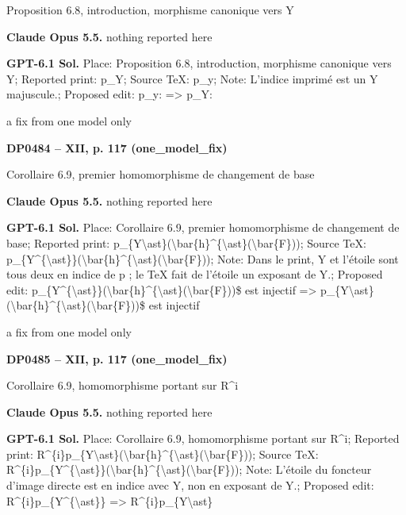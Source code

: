 Proposition 6.8, introduction, morphisme canonique vers Y\par
\textbf{Claude Opus 5.5.} nothing reported here\par
\textbf{GPT-6.1 Sol.} Place: Proposition 6.8, introduction, morphisme canonique vers Y; Reported print: p\_Y; Source TeX: p\_y; Note: L’indice imprimé est un Y majuscule.; Proposed edit: p\_y: =\allowbreak > p\_Y:\par
a fix from one model only\par
\par\noindent\hypertarget{DP0484}{}\textbf{DP0484 -- XII, p. 117 (one\_model\_fix)}\par
Corollaire 6.9, premier homomorphisme de changement de base\par
\textbf{Claude Opus 5.5.} nothing reported here\par
\textbf{GPT-6.1 Sol.} Place: Corollaire 6.9, premier homomorphisme de changement de base; Reported print: p\_\{Y\textbackslash{}ast\}(\textbackslash{}bar\{h\}\textasciicircum{}\{\textbackslash{}ast\}(\textbackslash{}bar\{F\})); Source TeX: p\_\{Y\textasciicircum{}\{\textbackslash{}ast\}\}(\textbackslash{}bar\{h\}\textasciicircum{}\{\textbackslash{}ast\}(\textbackslash{}bar\{F\})); Note: Dans le print, Y et l'étoile sont tous deux en indice de p ; le TeX fait de l'étoile un exposant de Y.; Proposed edit: p\_\{Y\textasciicircum{}\{\textbackslash{}ast\}\}(\textbackslash{}bar\{h\}\textasciicircum{}\{\textbackslash{}ast\}(\textbackslash{}bar\{F\}))\$ est injectif =\allowbreak > p\_\{Y\textbackslash{}ast\}(\textbackslash{}bar\{h\}\textasciicircum{}\{\textbackslash{}ast\}(\textbackslash{}bar\{F\}))\$ est injectif\par
a fix from one model only\par
\par\noindent\hypertarget{DP0485}{}\textbf{DP0485 -- XII, p. 117 (one\_model\_fix)}\par
Corollaire 6.9, homomorphisme portant sur R\textasciicircum{}i\par
\textbf{Claude Opus 5.5.} nothing reported here\par
\textbf{GPT-6.1 Sol.} Place: Corollaire 6.9, homomorphisme portant sur R\textasciicircum{}i; Reported print: R\textasciicircum{}\{i\}p\_\{Y\textbackslash{}ast\}(\textbackslash{}bar\{h\}\textasciicircum{}\{\textbackslash{}ast\}(\textbackslash{}bar\{F\})); Source TeX: R\textasciicircum{}\{i\}p\_\{Y\textasciicircum{}\{\textbackslash{}ast\}\}(\textbackslash{}bar\{h\}\textasciicircum{}\{\textbackslash{}ast\}(\textbackslash{}bar\{F\})); Note: L'étoile du foncteur d'image directe est en indice avec Y, non en exposant de Y.; Proposed edit: R\textasciicircum{}\{i\}p\_\{Y\textasciicircum{}\{\textbackslash{}ast\}\} =\allowbreak > R\textasciicircum{}\{i\}p\_\{Y\textbackslash{}ast\}\par
